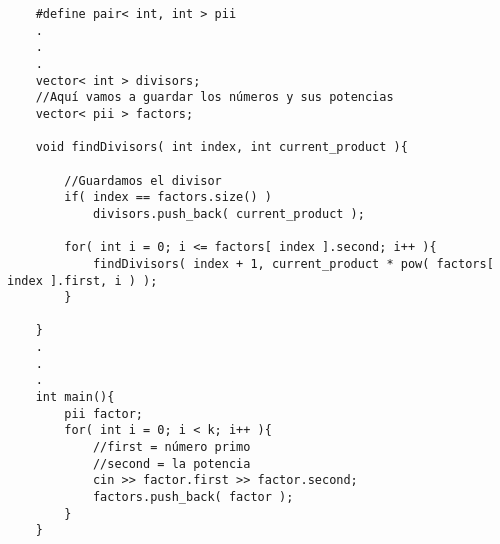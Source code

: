 \begin{lstlisting}
    #define pair< int, int > pii
    .
    .
    .
    vector< int > divisors;
    //Aquí vamos a guardar los números y sus potencias
    vector< pii > factors;

    void findDivisors( int index, int current_product ){

        //Guardamos el divisor
        if( index == factors.size() )
            divisors.push_back( current_product );

        for( int i = 0; i <= factors[ index ].second; i++ ){
            findDivisors( index + 1, current_product * pow( factors[ index ].first, i ) );
        }
            
    }
    .
    .
    .
    int main(){
        pii factor;
        for( int i = 0; i < k; i++ ){
            //first = número primo 
            //second = la potencia
            cin >> factor.first >> factor.second;
            factors.push_back( factor );
        }
    }
\end{lstlisting}

